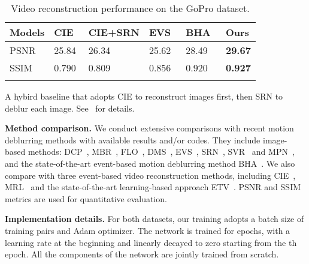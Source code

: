 \documentclass[10pt,twocolumn,letterpaper]{article}
\begin{document}
\begin{table}[t!]
	\centering
	\small
	\caption{Video reconstruction performance on the GoPro dataset.}
	\begin{tabularx}{\columnwidth}{p{0.95cm}<{\centering}p{0.95cm}<{\centering}p{1.2cm}<{\centering}p{0.95cm}<{\centering}p{0.95cm}<{\centering}p{1cm}<{\centering}}
		\toprule
		Models & CIE~\cite{ScheerlinckACCV18} & CIE+SRN & EVS~\cite{JinCVPR18} & BHA~\cite{PanCVPR19} & Ours \\
		\midrule
		PSNR & 25.84 & 26.34 & 25.62 & 28.49 & \textbf{29.67} \\
		SSIM & 0.790 & 0.809 & 0.856 & 0.920 & \textbf{0.927} \\
		\bottomrule
		\label{tab:gopro_video_metrics}
	\end{tabularx}
	\vspace{-7mm}
	\begin{tablenotes}
		\item *A hybird baseline that adopts CIE to reconstruct images first, then SRN to deblur each image. See~\cite{PanCVPR19} for details.
	\end{tablenotes}
	\vspace{-6mm}
\end{table}

\textbf{Method comparison.} We conduct extensive comparisons with recent motion deblurring methods with available results and/or codes. They include image-based methods: DCP~\cite{PanCVPR16}, MBR~\cite{SunCVPR15}, FLO~\cite{GongCVPR17}, DMS~\cite{NahCVPR17}, EVS~\cite{JinCVPR18}, SRN~\cite{TaoCVPR18}, SVR~\cite{ZhangCVPR18} and MPN~\cite{ZhangCVPR19}, and the state-of-the-art event-based motion deblurring method BHA~\cite{PanCVPR19}. We also compare with three event-based video reconstruction methods, including CIE~\cite{ScheerlinckACCV18}, MRL~\cite{MundaIJCV18} and the state-of-the-art learning-based approach ETV~\cite{RebecqCVPR19}. PSNR and SSIM metrics are used for quantitative evaluation. 

\textbf{Implementation details.} For both datasets, our training adopts a batch size of  training pairs and Adam optimizer. The network is trained for  epochs, with a learning rate  at the beginning and linearly decayed to zero starting from the th epoch. All the components of the network are jointly trained from scratch.
\end{document}
